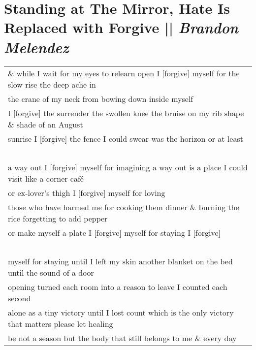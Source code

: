 
\section[Standing at The Mirror, Hate Is Replaced with Forgive]{Standing at The Mirror, Hate Is Replaced with Forgive || \emph{Brandon Melendez} \hspace*{\fill}  \thepage}
\label{sec:Mirror.tex}
\vspace*{0cm}
\begin{center}
\begin{tabular}{l}
\& while I wait for my eyes to relearn open \indent I [forgive] myself \indent for the slow rise the deep ache in \\
the crane of my neck \indent \indent from bowing down inside myself \\
I [forgive] the surrender the swollen knee \indent the bruise on my rib \indent shape \& shade of an August \\ 
sunrise \indent I [forgive] the fence \indent I could swear was the horizon \indent or at least\\

\-\ \\ a way out \indent I [forgive] myself for imagining \indent a way out is a place I could visit like a corner café\\
or ex-lover’s thigh \indent I [forgive] myself for loving\\
those who have harmed me \indent for cooking them dinner \& burning the rice \indent forgetting to add pepper\\
or make myself a plate \indent I [forgive] myself for staying \indent I [forgive]\\

\-\ \\ myself for staying \indent until I left my skin \indent another blanket on the bed \indent until the sound of a door\\
opening \indent turned each room into a reason to leave \indent I counted each second\\
alone as a tiny victory \indent until I lost count \indent which is the only victory that matters please let healing\\
be not a season \indent but the body that still belongs to me \indent \& every day\\


\end{tabular}
\end{center}
